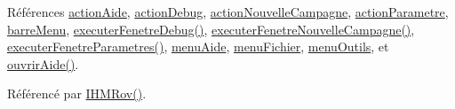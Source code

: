 Références \hyperlink{class_i_h_m_rov_aecd3c0b54390e60f6e1ba14787c68828}{action\+Aide}, \hyperlink{class_i_h_m_rov_abf3ebd717e5d59355dd271917962083f}{action\+Debug}, \hyperlink{class_i_h_m_rov_a1ea738e5224f6fa4fc61ac064b5d9a6e}{action\+Nouvelle\+Campagne}, \hyperlink{class_i_h_m_rov_aa1864bc274cc5662b212a3530255e4ad}{action\+Parametre}, \hyperlink{class_i_h_m_rov_a169e28bc630468d13c05de321f66ca3c}{barre\+Menu}, \hyperlink{class_i_h_m_rov_a8931cade7a1613975da7174b5c2e84d2}{executer\+Fenetre\+Debug()}, \hyperlink{class_i_h_m_rov_a3169e8cd9132ece69af974648066c6c1}{executer\+Fenetre\+Nouvelle\+Campagne()}, \hyperlink{class_i_h_m_rov_a2ec97de9b75c073c6a4dd0792a284002}{executer\+Fenetre\+Parametres()}, \hyperlink{class_i_h_m_rov_a7de335b17ef7b92fdb203cd385ba874f}{menu\+Aide}, \hyperlink{class_i_h_m_rov_ad110a9a5cfabc48491ee602075e28066}{menu\+Fichier}, \hyperlink{class_i_h_m_rov_aab4af4ee5ffb959869ee5f181fe4204e}{menu\+Outils}, et \hyperlink{class_i_h_m_rov_a45a10161fde8c6373918ec30f16a8b5e}{ouvrir\+Aide()}.



Référencé par \hyperlink{class_i_h_m_rov_a5dac1fb4612866cc61f699a415e0ef6b}{I\+H\+M\+Rov()}.



